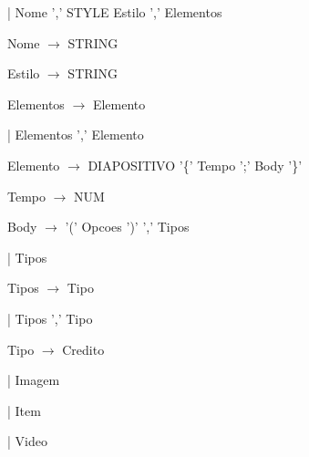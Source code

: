 \documentclass[11pt,a4paper]{report}
\begin{document}
\vspace{0.2cm}
\hspace{3.15cm} | Nome ',' STYLE Estilo ',' Elementos

\vspace{0.2cm}
\hspace{1.0cm} Nome $\rightarrow$ STRING

\vspace{0.2cm}
\hspace{1.0cm} Estilo $\rightarrow$ STRING

\vspace{0.2cm}
\hspace{1.0cm} Elementos $\rightarrow$ Elemento

\vspace{0.2cm}
\hspace{3.05cm} | Elementos ',' Elemento

\vspace{0.2cm}
\hspace{1.0cm} Elemento $\rightarrow$ DIAPOSITIVO '\{' Tempo ';' Body '\}'

\vspace{0.2cm}
\hspace{1.0cm} Tempo $\rightarrow$ NUM

\vspace{0.2cm}
\hspace{1.0cm} Body $\rightarrow$ '(' Opcoes ')' ',' Tipos

\vspace{0.2cm}
\hspace{2.3cm} | Tipos

\vspace{0.2cm}
\hspace{1.0cm} Tipos $\rightarrow$ Tipo

\vspace{0.2cm}
\hspace{2.3cm} | Tipos ',' Tipo

\vspace{0.2cm}
\hspace{1.0cm} Tipo $\rightarrow$ Credito

\vspace{0.2cm}
\hspace{2.2cm} | Imagem

\vspace{0.2cm}
\hspace{2.2cm} | Item

\vspace{0.2cm}
\hspace{2.2cm} | Video
\end{document}
